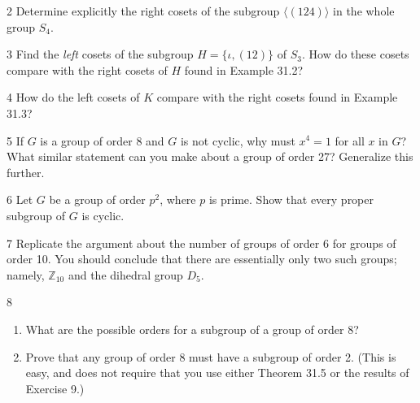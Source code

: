 \begin{problem}{2}
    Determine explicitly the right cosets of the subgroup $\langle (124) \rangle$ in the
    whole group $S_4$.
\end{problem}
\unsolved

\begin{problem}{3}
    Find the \emph{left} cosets of the subgroup $H = \{\iota, (12)\}$ of $S_3$. How do these
    cosets compare with the right cosets of $H$ found in Example 31.2?
\end{problem}
\unsolved

\begin{problem}{4}
    How do the left cosets of $K$ compare with the right cosets found in Example 31.3?
\end{problem}
\unsolved

\begin{problem}{5}
    If $G$ is a group of order 8 and $G$ is not cyclic, why must $x^4 = 1$ for all $x$ in
    $G$? What similar statement can you make about a group of order 27? Generalize this
    further.
\end{problem}
\unsolved

\begin{problem}{6}
    Let $G$ be a group of order $p^2$, where $p$ is prime. Show that every proper subgroup
    of $G$ is cyclic.
\end{problem}
\unsolved

\begin{problem}{7}
    Replicate the argument about the number of groups of order 6 for groups of order 10.
    You should conclude that there are essentially only two such groups; namely,
    $\mathbb{Z}_{10}$ and the dihedral group $D_5$.
\end{problem}
\unsolved

\begin{problem}{8}
    \begin{enumerate}
        \item[(a)] What are the possible orders for a subgroup of a group of order 8?
        \item[(b)] Prove that any group of order 8 must have a subgroup of order 2. (This
        is easy, and does not require that you use either Theorem 31.5 or the results of
        Exercise 9.)
    \end{enumerate}
\end{problem}
\unsolved

